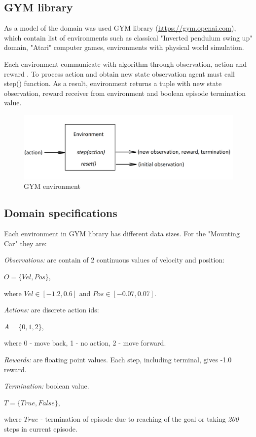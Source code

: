 \documentclass[12pt]{article}
\begin{document}
\subsection{GYM library}{
As a model of the domain was used GYM library (\url{https://gym.openai.com}), which contain list of environments such as classical "Inverted pendulum swing up" domain, "Atari" computer games, environments with physical world simulation.\par
Each environment communicate with algorithm through observation, action and reward . To process action and obtain new state observation agent must call step() function. As a result, environment returns a tuple with new state observation, reward receiver from environment and boolean episode termination value.
\begin{figure}[h!]
\begin{center}
\includegraphics[scale=0.5]{images/gym_env.png}
\end{center}
\caption{GYM environment}
\label{gym_env}
\end{figure}
}
\subsection{Domain specifications}
\label{subsec:spec}{
Each environment in GYM library has different data sizes. For the "Mounting Car" they are:\par
\textit{Observations:} are contain of 2 continuous values of velocity and position:
\begin{center}
$O=\{Vel, Pos\}$,
\end{center}
where $Vel \in [-1.2, 0.6]$ and $Pos \in [-0.07, 0.07]$.\par
\textit{Actions:} are discrete action ids:
\begin{center}
$A=\{0, 1, 2\}$,
\end{center}
where 0 - move back, 1 - no action, 2 - move forward.\par
\textit{Rewards:} are floating point values. Each step, including terminal, gives -1.0 reward.\par
\textit{Termination:} boolean value.
\begin{center}
$T=\{True, False\}$,
\end{center}
where $True$ - termination of episode due to reaching of the goal or taking \textit{200} steps in current episode.\par
}
\end{document}
